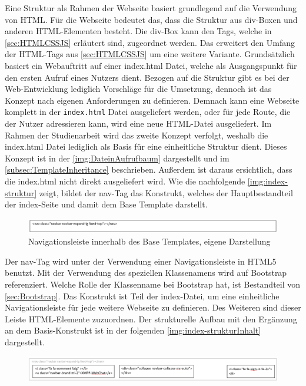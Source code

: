 \documentclass[a4paper,titlepage,halfparskip,12pt]{scrreprt}
\begin{document}
\begin{onehalfspacing}
Eine Struktur als Rahmen der Webseite basiert grundlegend auf die Verwendung von \ac{HTML}. Für die Webseite bedeutet das, dass die Struktur aus div-Boxen und anderen \ac{HTML}-Elementen besteht. Die div-Box kann den Tags, welche in \autoref{sec:HTMLCSSJS} erläutert sind, zugeordnet werden. Das erweitert den Umfang der \ac{HTML}-Tags aus \autoref{sec:HTMLCSSJS} um eine weitere Variante. Grundsätzlich basiert ein Webauftritt auf einer index.html Datei, welche als Ausgangspunkt für den ersten Aufruf eines Nutzers dient. Bezogen auf die Struktur gibt es bei der Web-Entwicklung lediglich Vorschläge für die Umsetzung, dennoch ist das Konzept nach eigenen Anforderungen zu definieren. Demnach kann eine Webseite komplett in der \texttt{index.html} Datei ausgeliefert werden, oder für jede Route, die der Nutzer adressieren kann, wird eine neue \ac{HTML}-Datei ausgeliefert. Im Rahmen der Studienarbeit wird das zweite Konzept verfolgt, weshalb die index.html Datei lediglich als Basis für eine einheitliche Struktur dient. Dieses Konzept ist in der \autoref{img:DateinAufrufbaum} dargestellt und im \autoref{subsec:TemplateInheritance} beschrieben. Außerdem ist daraus ersichtlich, dass die index.html nicht direkt ausgeliefert wird. Wie die nachfolgende \autoref{img:index-struktur} zeigt, bildet der nav-Tag das Konstrukt, welches der Hauptbestandteil der index-Seite und damit dem Base Template darstellt.
\begin{figure}[h]
	\centering
	\includegraphics[width=\linewidth]{images/indexbody}
	\caption{Navigationsleiste innerhalb des Base Templates, eigene Darstellung}
	\label{img:index-struktur}
\end{figure}
Der nav-Tag wird unter der Verwendung einer Navigationsleiste in HTML5 benutzt. Mit der Verwendung des speziellen Klassenamens wird auf Bootstrap referenziert. Welche Rolle der Klassenname bei Bootstrap hat, ist Bestandteil von \autoref{sec:Bootstrap}. Das Konstrukt ist Teil der index-Datei, um eine einheitliche Navigationsleiste für jede weitere Webseite zu definieren. Des Weiteren sind dieser Leiste HTML-Elemente zuzuordnen. Der strukturelle Aufbau mit den Ergänzung an dem Basis-Konstrukt ist in der folgenden \autoref{img:index-strukturInhalt} dargestellt.
\begin{figure}[h]
	\centering
	\includegraphics[width=\linewidth]{images/indexbodyInhalt}

\end{figure}
\end{onehalfspacing}
\end{document}
